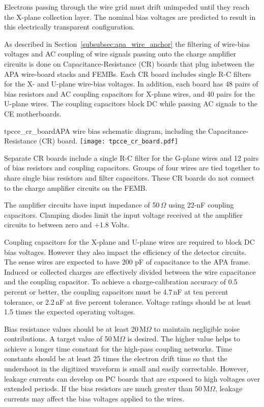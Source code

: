 Electrons passing through the wire grid must drift unimpeded until they reach the X-plane 
collection layer. The nominal bias voltages are predicted to result in this electrically 
transparent configuration.

As described in Section~\ref{subsubsec:apa_wire_anchor}
 the filtering of wire-bias voltages and AC coupling of wire signals passing
onto the charge amplifier circuits is done on Capacitance-Resistance (CR) boards that plug inbetween the APA wire-board stacks and FEMBs.
Each CR board includes single R-C filters for the X- and U-plane wire-bias voltages. In addition, each board has 48 
pairs of bias resistors and AC coupling capacitors for X-plane wires, and 40 pairs for the U-plane wires. The coupling capacitors block DC while passing AC 
signals to the CE motherboards.

\begin{cdrfigure}{tpcce_cr_board}{APA wire bias 
schematic diagram, including the Capacitance-Resistance (CR) board.}
\texttt{[image: tpcce\_cr\_board.pdf]}
\end{cdrfigure}

Separate CR boards include a single R-C filter for the G-plane wires and 12 pairs of bias resistors and
coupling capacitors.
Groups of four wires are tied together to share single
bias resistors and filter capacitors. These CR boards do not connect to the charge amplifier circuits on the FEMB.

The amplifier circuits 
have input impedance of 50\,$\Omega$ using 22-nF coupling capacitors. 
Clamping diodes limit the input voltage received at the amplifier circuits to between zero and +1.8 Volts.

Coupling capacitors for the X-plane and U-plane wires are required to block DC bias voltages.
However they also impact the efficiency of the detector circuits.
The sense wires are expected to have 200 pF of capacitance to the APA frame.
Induced or collected charges are effectively divided between the wire capacitance and the coupling capacitor.
To achieve a charge-calibration accuracy of 0.5 percent or better,
the coupling capacitors must be 4.7\,nF at ten percent tolerance, or 2.2\,nF at five percent tolerance.
Voltage ratings should be at least 1.5 times the expected operating voltages.

Bias resistance values should be at least 20\,M$\Omega$ to maintain negligible noise contributions.
A target value of 50\,M$\Omega$ is desired.
The higher value helps to achieve a longer time constant for the high-pass coupling networks.
Time constants should be at least 25 times the electron drift time so that the undershoot in the digitized waveform
is small and easily correctable.
However, leakage currents can develop on PC boards that are exposed to high voltages over extended periods.
If the bias resistors are much greater than 50\,M$\Omega$, leakage currents may affect the bias voltages applied to the wires.

